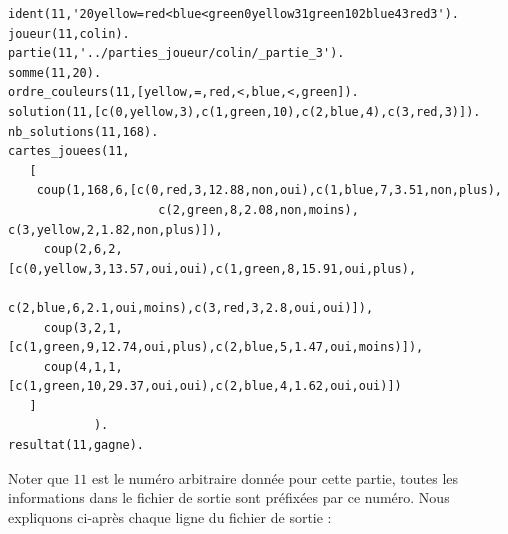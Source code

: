\documentclass[a4paper,12pt]{article}
\begin{document}
\begin{Verbatim}
ident(11,'20yellow=red<blue<green0yellow31green102blue43red3').
joueur(11,colin).
partie(11,'../parties_joueur/colin/_partie_3').
somme(11,20).
ordre_couleurs(11,[yellow,=,red,<,blue,<,green]).
solution(11,[c(0,yellow,3),c(1,green,10),c(2,blue,4),c(3,red,3)]).
nb_solutions(11,168).
cartes_jouees(11,
   [
 	coup(1,168,6,[c(0,red,3,12.88,non,oui),c(1,blue,7,3.51,non,plus), 
 				     c(2,green,8,2.08,non,moins), c(3,yellow,2,1.82,non,plus)]),
     coup(2,6,2,[c(0,yellow,3,13.57,oui,oui),c(1,green,8,15.91,oui,plus),
     				  c(2,blue,6,2.1,oui,moins),c(3,red,3,2.8,oui,oui)]),
     coup(3,2,1,[c(1,green,9,12.74,oui,plus),c(2,blue,5,1.47,oui,moins)]),
     coup(4,1,1,[c(1,green,10,29.37,oui,oui),c(2,blue,4,1.62,oui,oui)])
   ]
            ).
resultat(11,gagne).
\end{Verbatim}

Noter que $11$ est le numéro arbitraire donnée pour cette partie, toutes les informations dans le fichier de sortie sont préfixées par ce numéro. Nous expliquons ci-après chaque ligne du fichier de sortie :
\end{document}
